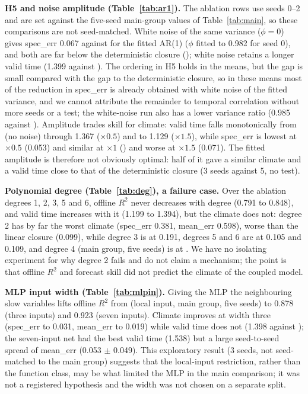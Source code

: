 \textbf{H5 and noise amplitude (Table~\ref{tab:ar1}).} The ablation rows use seeds 0--2 and are set against the five-seed main-group values of Table~\ref{tab:main}, so these comparisons are not seed-matched. White noise of the same variance ($\phi{=}0$) gives spec\_err 0.067 against  for the fitted AR(1) ($\phi$ fitted to 0.982 for seed 0), and both are far below the deterministic closure (); white noise retains a longer valid time (1.399 against ). The ordering in H5 holds in the means, but the gap is small compared with the gap to the deterministic closure, so in these means most of the reduction in spec\_err is already obtained with white noise of the fitted variance, and we cannot attribute the remainder to temporal correlation without more seeds or a test; the white-noise run also has a lower variance ratio (0.985 against ). Amplitude trades skill for climate: valid time falls monotonically from  (no noise) through 1.367 ($\times0.5$) and  to 1.129 ($\times1.5$), while spec\_err is lowest at $\times0.5$ (0.053) and similar at $\times1$ () and worse at $\times1.5$ (0.071). The fitted amplitude is therefore not obviously optimal: half of it gave a similar climate and a valid time close to that of the deterministic closure (3 seeds against 5, no test).

\textbf{Polynomial degree (Table~\ref{tab:deg}), a failure case.} Over the ablation degrees 1, 2, 3, 5 and 6, offline $R^2$ never decreases with degree (0.791 to 0.848), and valid time increases with it (1.199 to 1.394), but the climate does not: degree 2 has by far the worst climate (spec\_err 0.381, mean\_err 0.598), worse than the linear closure (0.099), while degree 3 is at 0.191, degrees 5 and 6 are at 0.105 and 0.109, and degree 4 (main group, five seeds) is at . We have no isolating experiment for why degree 2 fails and do not claim a mechanism; the point is that offline $R^2$ and forecast skill did not predict the climate of the coupled model.

\textbf{MLP input width (Table~\ref{tab:mlpin}).} Giving the MLP the neighbouring slow variables lifts offline $R^2$ from  (local input, main group, five seeds) to 0.878 (three inputs) and 0.923 (seven inputs). Climate improves at width three (spec\_err  to 0.031, mean\_err  to 0.019) while valid time does not (1.398 against ); the seven-input net had the best valid time (1.538) but a large seed-to-seed spread of mean\_err (0.053 $\pm$ 0.049). This exploratory result (3 seeds, not seed-matched to the main group) suggests that the local-input restriction, rather than the function class, may be what limited the MLP in the main comparison; it was not a registered hypothesis and the width was not chosen on a separate split.

